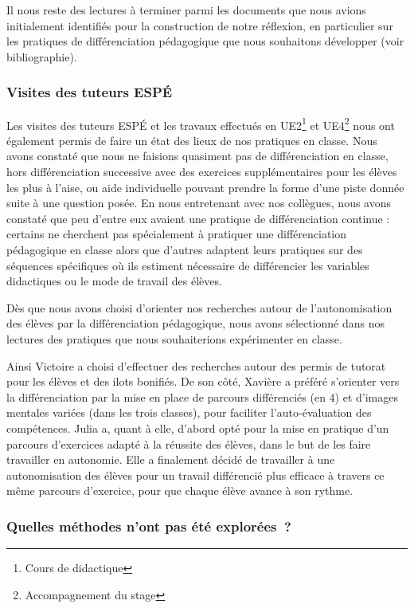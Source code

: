 Il nous reste des lectures à terminer parmi les documents que nous avions initialement identifiés pour la construction de notre réflexion, en particulier sur les pratiques de différenciation pédagogique que nous souhaitons développer (voir bibliographie).

\subsubsection{Visites des tuteurs ESPÉ}

Les visites des tuteurs ESPÉ et les travaux effectués en UE2\footnote{Cours de didactique} et UE4\footnote{Accompagnement du stage} nous ont également permis de faire un état des lieux de nos pratiques en classe. Nous avons constaté que nous ne faisions quasiment pas de différenciation en classe, hors différenciation successive avec des exercices supplémentaires pour les élèves les plus à l’aise, ou aide individuelle pouvant prendre la forme d’une piste donnée suite à une question posée.
En nous entretenant avec nos collègues, nous avons constaté que peu d’entre eux avaient une pratique de différenciation continue : certains ne cherchent pas spécialement à pratiquer une différenciation pédagogique en classe alors que d’autres adaptent leurs pratiques sur des séquences spécifiques où ils estiment nécessaire de différencier les variables didactiques ou le mode de travail des élèves.

Dès que nous avons choisi d’orienter nos recherches autour de l’autonomisation des élèves par la différenciation pédagogique, nous avons sélectionné dans nos lectures des pratiques que nous souhaiterions expérimenter en classe.

Ainsi Victoire a choisi d’effectuer des recherches autour des permis de tutorat pour les élèves et des ilots bonifiés. De son côté, Xavière a préféré s’orienter vers la différenciation par la mise en place de parcours différenciés (en 4) et d’images mentales variées (dans les trois classes), pour faciliter l’auto-évaluation des compétences. Julia a, quant à elle, d’abord opté pour la mise en pratique d’un parcours d’exercices adapté à la réussite des élèves, dans le but de les faire travailler en autonomie. Elle a finalement décidé de travailler à une autonomisation des élèves pour un travail différencié plus efficace à travers ce même parcours d’exercice, pour que chaque élève avance à son rythme.

\subsubsection{Quelles méthodes n'ont pas été explorées ?}

